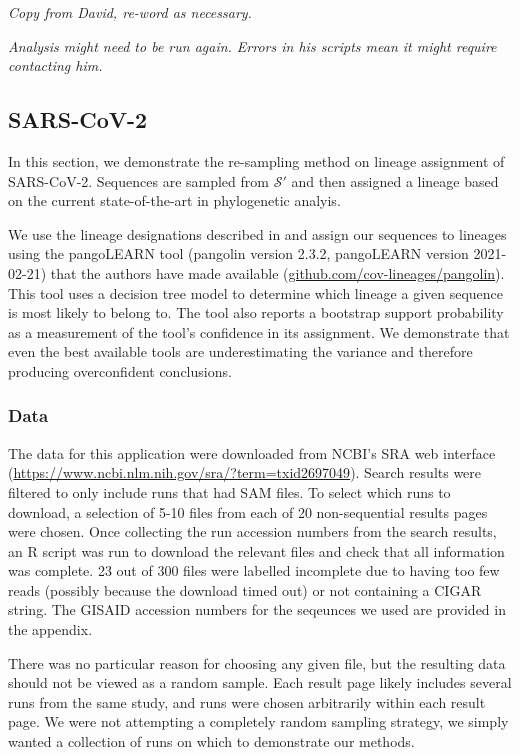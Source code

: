 \documentclass[
]{article}
\newcommand{\nps}{\mathcal{S}} %
\begin{document}
\emph{Copy from David, re-word as necessary.}

\emph{Analysis might need to be run again. Errors in his scripts mean it
might require contacting him.}

\hypertarget{sars-cov-2}{%
\subsection{SARS-CoV-2}\label{sars-cov-2}}

In this section, we demonstrate the re-sampling method on lineage
assignment of SARS-CoV-2. Sequences are sampled from \(\nps'\) and then
assigned a lineage based on the current state-of-the-art in phylogenetic
analyis.

We use the lineage designations described in
\citet{rambautDynamicNomenclatureProposal2020} and assign our sequences
to lineages using the pangoLEARN tool (pangolin version 2.3.2,
pangoLEARN version 2021-02-21) that the authors have made available
(\url{github.com/cov-lineages/pangolin}). This tool uses a decision tree
model to determine which lineage a given sequence is most likely to
belong to. The tool also reports a bootstrap support probability as a
measurement of the tool's confidence in its assignment. We demonstrate
that even the best available tools are underestimating the variance and
therefore producing overconfident conclusions.

\hypertarget{data}{%
\subsubsection{Data}\label{data}}

The data for this application were downloaded from NCBI's SRA web
interface (\url{https://www.ncbi.nlm.nih.gov/sra/?term=txid2697049}).
Search results were filtered to only include runs that had SAM files. To
select which runs to download, a selection of 5-10 files from each of 20
non-sequential results pages were chosen. Once collecting the run
accession numbers from the search results, an R script was run to
download the relevant files and check that all information was complete.
23 out of 300 files were labelled incomplete due to having too few reads
(possibly because the download timed out) or not containing a CIGAR
string. The GISAID accession numbers for the seqeunces we used are
provided in the appendix.

There was no particular reason for choosing any given file, but the
resulting data should not be viewed as a random sample. Each result page
likely includes several runs from the same study, and runs were chosen
arbitrarily within each result page. We were not attempting a completely
random sampling strategy, we simply wanted a collection of runs on which
to demonstrate our methods.
\end{document}

